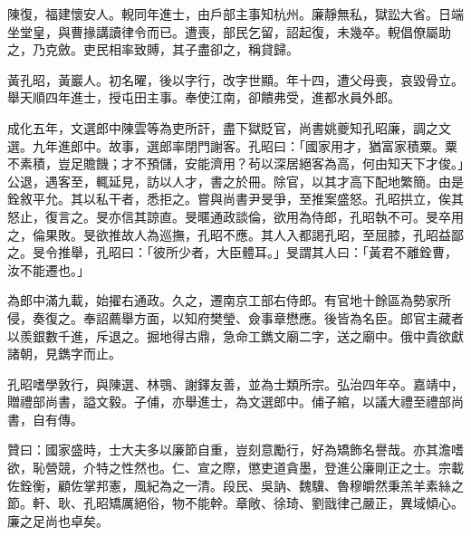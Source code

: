\begin{pinyinscope}
陳復，福建懷安人。輗同年進士，由戶部主事知杭州。廉靜無私，獄訟大省。日端坐堂皇，與曹掾講讀律令而已。遭喪，部民乞留，詔起復，未幾卒。輗倡僚屬助之，乃克斂。吏民相率致賻，其子盡卻之，稱貸歸。

黃孔昭，黃巖人。初名曜，後以字行，改字世顯。年十四，遭父母喪，哀毀骨立。舉天順四年進士，授屯田主事。奉使江南，卻饋弗受，進都水員外郎。

成化五年，文選郎中陳雲等為吏所訐，盡下獄貶官，尚書姚夔知孔昭廉，調之文選。九年進郎中。故事，選郎率閉門謝客。孔昭曰：「國家用才，猶富家積粟。粟不素積，豈足贍饑；才不預儲，安能濟用？茍以深居絕客為高，何由知天下才俊。」公退，遇客至，輒延見，訪以人才，書之於冊。除官，以其才高下配地繁簡。由是銓敘平允。其以私干者，悉拒之。嘗與尚書尹旻爭，至推案盛怒。孔昭拱立，俟其怒止，復言之。旻亦信其諒直。旻暱通政談倫，欲用為侍郎，孔昭執不可。旻卒用之，倫果敗。旻欲推故人為巡撫，孔昭不應。其人入都謁孔昭，至屈膝，孔昭益鄙之。旻令推舉，孔昭曰：「彼所少者，大臣體耳。」旻謂其人曰：「黃君不離銓曹，汝不能遷也。」

為郎中滿九載，始擢右通政。久之，遷南京工部右侍郎。有官地十餘區為勢家所侵，奏復之。奉詔薦舉方面，以知府樊瑩、僉事章懋應。後皆為名臣。郎官主藏者以羨銀數千進，斥退之。掘地得古鼎，急命工鐫文廟二字，送之廟中。俄中貴欲獻諸朝，見鐫字而止。

孔昭嗜學敦行，與陳選、林鶚、謝鐸友善，並為士類所宗。弘治四年卒。嘉靖中，贈禮部尚書，謚文毅。子俌，亦舉進士，為文選郎中。俌子綰，以議大禮至禮部尚書，自有傳。

贊曰：國家盛時，士大夫多以廉節自重，豈刻意勵行，好為矯飾名譽哉。亦其澹嗜欲，恥營競，介特之性然也。仁、宣之際，懲吏道貪墨，登進公廉剛正之士。宗載佐銓衡，顧佐掌邦憲，風紀為之一清。段民、吳訥、魏驥、魯穆皭然秉羔羊素絲之節。軒、耿、孔昭矯厲絕俗，物不能幹。章敞、徐琦、劉戩律己嚴正，異域傾心。廉之足尚也卓矣。


\end{pinyinscope}